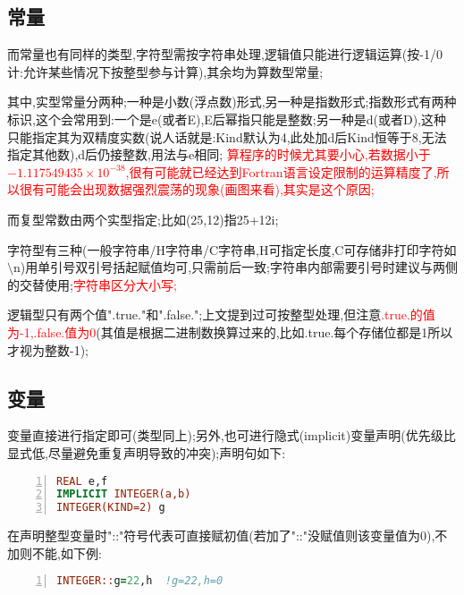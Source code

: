
\subsection{常量}
而常量也有同样的类型,字符型需按字符串处理,逻辑值只能进行逻辑运算(按-1/0计:允许某些情况下按整型参与计算),其余均为算数型常量;
\par

其中,实型常量分两种;一种是小数(浮点数)形式,另一种是指数形式;指数形式有两种标识,这个会常用到:一个是e(或者E),E后幂指只能是整数;另一种是d(或者D),这种只能指定其为双精度实数(说人话就是:Kind默认为4,此处加d后Kind恒等于8,无法指定其他数),d后仍接整数,用法与e相同;
\textcolor{red}{算程序的时候尤其要小心,若数据小于$-1.117549435 \times 10^{-38}$,很有可能就已经达到Fortran语言设定限制的运算精度了,所以很有可能会出现数据强烈震荡的现象(画图来看),其实是这个原因;}
\par

而复型常数由两个实型指定;比如(25,12)指25+12i;\par

字符型有三种(一般字符串/H字符串/C字符串,H可指定长度,C可存储非打印字符如$\setminus$n)用单引号双引号括起赋值均可,只需前后一致;字符串内部需要引号时建议与两侧的交替使用;\textcolor{red}{字符串区分大小写;}\par

逻辑型只有两个值".true."和".false.";上文提到过可按整型处理,但注意\textcolor{red}{.true.的值为-1,.false.值为0}(其值是根据二进制数换算过来的,比如.true.每个存储位都是1所以才视为整数-1);\par

\subsection{变量}
变量直接进行指定即可(类型同上);另外,也可进行隐式(implicit)变量声明(优先级比显式低,尽量避免重复声明导致的冲突);声明句如下:

\begin{lstlisting}[numbers=left,frame=single,language=Fortran]
REAL e,f
IMPLICIT INTEGER(a,b)
INTEGER(KIND=2) g
\end{lstlisting}
\par

在声明整型变量时"::"符号代表可直接赋初值(若加了"::"没赋值则该变量值为0),不加则不能,如下例:

\begin{lstlisting}[numbers=left,frame=single,language=Fortran]
INTEGER::g=22,h  !g=22,h=0
\end{lstlisting}
\par

